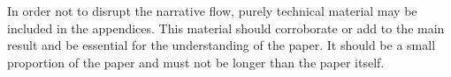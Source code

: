 \documentclass[lineno]{jfm}
\begin{document}


\appendix

\section{}\label{appA}
 In order not to disrupt the narrative flow, purely technical material may be included in the appendices. This material should corroborate or add to the main result and be essential for the understanding of the paper. It should be a small proportion of the paper and must not be longer than the paper itself.



\end{document}
